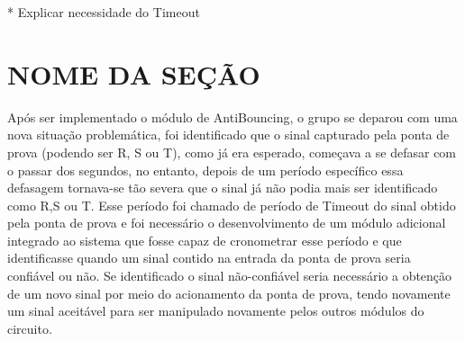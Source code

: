 \documentclass[12pt,a4paper,openany]{abntex2}
\begin{document}
* Explicar necessidade do Timeout
\section{NOME DA SEÇÃO}

  Após ser implementado o módulo de AntiBouncing, o grupo se deparou com uma nova
situação problemática, foi identificado que o sinal capturado pela ponta de prova
(podendo ser R, S ou T), como já era esperado, começava a se defasar com o passar
dos segundos, no entanto, depois de um período específico essa defasagem tornava-se
tão severa que o sinal já não podia mais ser identificado como R,S ou T.
  Esse período foi chamado de período de Timeout do sinal obtido pela ponta de prova
e foi necessário o desenvolvimento de um módulo adicional integrado ao sistema que
fosse capaz de cronometrar esse período e que identificasse quando um sinal contido
na entrada da ponta de prova seria confiável ou não.
  Se identificado o sinal não-confiável seria necessário a obtenção de um novo sinal
por meio do acionamento da ponta de prova, tendo novamente um sinal aceitável para
ser manipulado novamente pelos outros módulos do circuito.



\end{document}
